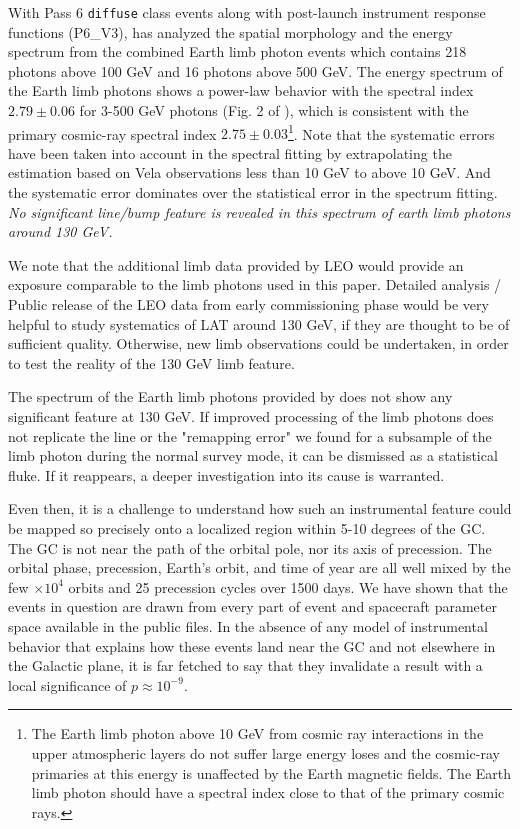 \documentclass[aps,twocolumn,prd,superscriptaddress,showpacs,nofootinbib,fixfloat]{revtex4}
\begin{document}
With Pass 6 \texttt{diffuse} class events along with post-launch
instrument response functions (P6\_V3), \cite{FermiLimb} has
analyzed the spatial morphology and the energy spectrum from
the combined Earth limb photon events which contains 218
photons above 100 GeV and 16 photons above 500 GeV. The
energy spectrum of the Earth limb photons shows a power-law
behavior with the spectral index $2.79\pm 0.06$ for 3-500
GeV photons (Fig. 2 of \cite{FermiLimb}), which is
consistent with the primary cosmic-ray spectral index
$2.75\pm 0.03$\footnote{The Earth limb photon above 10 GeV
  from cosmic ray interactions in the upper atmospheric
  layers do not suffer large energy loses and the cosmic-ray
  primaries at this energy is unaffected by the Earth
  magnetic fields. The Earth limb photon should have a
  spectral index close to that of the primary cosmic
  rays. }. Note that the systematic errors have been taken into
account in the spectral fitting by extrapolating the estimation based on Vela
observations less than 10 GeV to above 10 GeV. And the
systematic error dominates over the statistical error in the
spectrum fitting. \emph{No significant line/bump feature is revealed in this spectrum of earth limb photons around 130 GeV.}


We note that the additional limb data provided by LEO would
provide an exposure comparable to the limb photons used
in this paper. Detailed analysis / Public release of the LEO data
from early commissioning phase would be very helpful to study systematics of LAT around 130 GeV, if they are thought to be of
sufficient quality.  Otherwise, new limb observations could
be undertaken, in order to test the reality of the 130 GeV
limb feature.

The spectrum of the Earth limb photons provided by
\citep{FermiLimb} does not show any significant feature at
130 GeV. If improved processing of the limb photons does not replicate the line
or the "remapping error" we found for a subsample of the
limb photon during the normal survey mode, it can be
dismissed as a statistical fluke.  If it reappears, a deeper
investigation into its cause is warranted.

Even then, it is a challenge to understand how such an
instrumental feature could be mapped so precisely onto a
localized region within 5-10 degrees of the GC.  The GC is
not near the path of the orbital pole, nor its axis of
precession.  The orbital phase, precession, Earth's orbit,
and time of year are all well mixed by the few $\times10^4$
orbits and 25 precession cycles over 1500 days.  We have
shown that the events in question are drawn from every part
of event and spacecraft parameter space available in the
public files.  In the absence of any model of instrumental
behavior that explains how these events land near the GC and
not elsewhere in the Galactic plane, it is far fetched to
say that they invalidate a result with a local significance
of $p\approx10^{-9}$.
\end{document}
